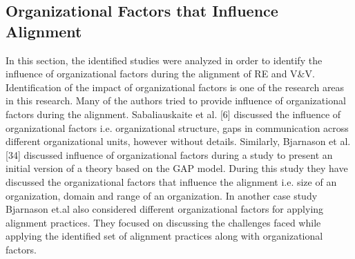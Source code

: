 \documentclass{article}
\begin{document}
\subsection{Organizational Factors that Influence Alignment}\label{ResultsOrgFactors}
In this section, the identified studies were analyzed in order to identify the influence of organizational factors during the alignment of RE and V&V. Identification of the impact of organizational factors is one of the research areas in this research.
Many of the authors tried to provide influence of organizational factors during the alignment.  Sabaliauskaite et al. [6] discussed the influence of organizational factors i.e. organizational structure, gaps in communication across different organizational units, however without details.  Similarly, Bjarnason et al.[34] discussed influence of organizational factors during a study to present an initial version of a theory based on the GAP model. During this study they have discussed the organizational factors that influence the alignment i.e. size of an organization, domain and range of an organization. In another case study \cite{bjarnason2014challengesS9} Bjarnason et.al also considered different organizational factors for applying alignment practices. They focused on discussing the challenges faced while applying the identified set of alignment practices along with organizational factors. 
\end{document}
